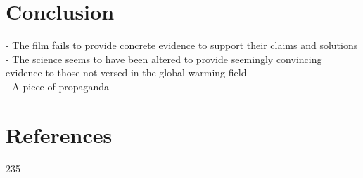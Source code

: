 \documentclass[12pt]{article}
\begin{document}
\section{Conclusion}
	- The film fails to provide concrete evidence to support their claims and solutions\\
	- The science seems to have been altered to provide seemingly convincing evidence to those not versed in the global warming field \\
	- A piece of propaganda \\
\section{References}
235
\end{document}
